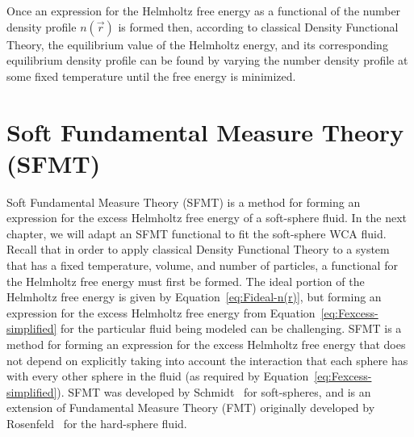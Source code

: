 \documentclass[double,12pt]{beavtex}
\begin{document}
Once an expression for the Helmholtz free energy as a functional of the
number density profile $n(\vec r)$ is formed then, according to classical 
Density Functional Theory, the equilibrium value of the 
Helmholtz energy, and its corresponding equilibrium density profile can be
found by varying the number density profile
at some fixed temperature until the free energy is minimized.  
 

\section{Soft Fundamental Measure Theory (SFMT)}
Soft Fundamental Measure Theory (SFMT) is a method for forming an 
expression for the excess Helmholtz free energy of a soft-sphere fluid.
In the next chapter, 
we will adapt an SFMT functional to fit the soft-sphere WCA fluid.
Recall that in order to apply classical Density Functional Theory 
to a system that has a fixed temperature, volume, and number of particles, 
a functional for the Helmholtz free energy must first be formed. 
The ideal portion of the Helmholtz free energy is given by 
Equation~\ref{eq:Fideal-n(r)}, but forming an expression for the excess 
Helmholtz free energy from Equation~\ref{eq:Fexcess-simplified} for the 
particular fluid being modeled can be challenging. 
SFMT is a method for forming an 
expression for the excess Helmholtz free energy
that does not depend on explicitly taking into account the interaction 
that each sphere has with every other sphere in the fluid (as required by 
Equation~\ref{eq:Fexcess-simplified}).
SFMT was developed by Schmidt~\cite{schmidt1999density, schmidt2000fluid} 
for soft-spheres, and is an extension of Fundamental Measure Theory (FMT) 
originally developed by 
Rosenfeld~\cite{rosenfeld1989, rosenfeld1994, rosenfeld1996, fmtfromsptandsignerror} 
for the hard-sphere fluid. 
\end{document}
